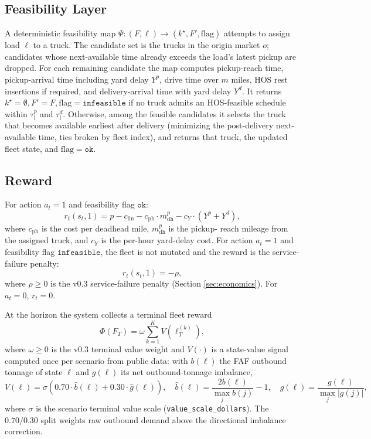 \documentclass[11pt]{article}
\begin{document}
\subsection{Feasibility Layer}

A deterministic feasibility map $\Psi : (F, \ell) \to (k^\star, F', \mathrm{flag})$
attempts to assign load $\ell$ to a truck. The candidate set is the trucks
in the origin market $o$; candidates whose next-available time already
exceeds the load's latest pickup are dropped. For each remaining candidate
the map computes pickup-reach time, pickup-arrival time including yard
delay $Y^p$, drive time over $m$ miles, HOS rest insertions if required,
and delivery-arrival time with yard delay $Y^d$. It returns
$k^\star = \emptyset, F' = F, \mathrm{flag} = \texttt{infeasible}$ if no
truck admits an HOS-feasible schedule within $\tau^{p}_{\mathrm{l}}$ and
$\tau^{d}_{\mathrm{l}}$. Otherwise, among the feasible candidates it selects
the truck that becomes available earliest after delivery (minimizing the
post-delivery next-available time, ties broken by fleet index), and returns
that truck, the updated fleet state, and $\mathrm{flag} = \texttt{ok}$.

\subsection{Reward}

For action $a_t = 1$ and feasibility flag $\texttt{ok}$:
\begin{equation}
  r_t(s_t, 1) = p - c_{\mathrm{lin}} - c_{\mathrm{ph}} \cdot m^{p}_{\mathrm{dh}}
    - c_{Y} \cdot (Y^{p} + Y^{d}),
\end{equation}
where $c_{\mathrm{ph}}$ is the cost per deadhead mile, $m^{p}_{\mathrm{dh}}$ is the pickup-
reach mileage from the assigned truck, and $c_Y$ is the per-hour yard-delay
cost. For action $a_t = 1$ and feasibility flag $\texttt{infeasible}$, the
fleet is not mutated and the reward is the service-failure penalty:
\begin{equation}
  r_t(s_t, 1) = -\rho,
\end{equation}
where $\rho \geq 0$ is the v0.3 service-failure penalty (Section
\ref{sec:economics}). For $a_t = 0$, $r_t = 0$.

At the horizon the system collects a terminal fleet reward
\begin{equation}
  \Phi(F_T) = \omega \sum_{k=1}^{K} V(\ell^{(k)}_T),
  \label{eq:terminal}
\end{equation}
where $\omega \geq 0$ is the v0.3 terminal value weight and $V(\cdot)$ is a
state-value signal computed once per scenario from public data: with
$b(\ell)$ the FAF outbound tonnage of state $\ell$ and $g(\ell)$ its net
outbound-tonnage imbalance,
\begin{equation}
  V(\ell) = \sigma \left( 0.70 \cdot \hat{b}(\ell) + 0.30 \cdot \hat{g}(\ell) \right),
  \quad \hat{b}(\ell) = \frac{2 b(\ell)}{\max_j b(j)} - 1, \quad
  \hat{g}(\ell) = \frac{g(\ell)}{\max_j |g(j)|},
  \label{eq:statevalue}
\end{equation}
where $\sigma$ is the scenario terminal value scale
(\texttt{value\_scale\_dollars}). The $0.70/0.30$ split weights raw
outbound demand above the directional imbalance correction.
\end{document}

